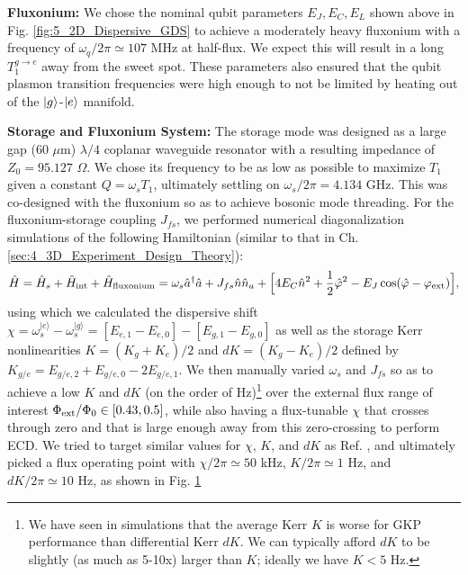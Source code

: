\noindent \textbf{Fluxonium:} We chose the nominal qubit parameters $E_J, E_C, E_L$ shown above in Fig. \ref{fig:5_2D_Dispersive_GDS} to achieve a moderately heavy fluxonium with a frequency of $\omega_q/2\pi \simeq 107$ MHz at half-flux. We expect this will result in a long $T_1^{g\to e}$ away from the sweet spot. These parameters also ensured that the qubit plasmon transition frequencies were high enough to not be limited by heating out of the $\lvert g\rangle$-$\lvert e\rangle$ manifold. 


\noindent \textbf{Storage and Fluxonium System:} The storage mode was designed as a large gap (60 $\mu$m) $\lambda/4$ coplanar waveguide resonator with a resulting impedance of $Z_0 = 95.127$ $\Omega$. We chose its frequency to be as low as possible to maximize $T_1$ given a constant $Q = \omega_s T_1$, ultimately settling on $\omega_s/2\pi = 4.134$ GHz. This was co-designed with the fluxonium so as to achieve bosonic mode threading. For the fluxonium-storage coupling $J_{fs}$, we performed numerical diagonalization simulations of the following Hamiltonian (similar to that in Ch. \ref{sec:4_3D_Experiment_Design_Theory}):
\begin{equation}
    \hat{H} =  \hat{H}_s + \hat{H}_{\rm int} + \hat{H}_{\rm fluxonium} =  \omega_s \hat{a}^\dagger \hat{a} + J_{fs} \hat{n}\hat{n}_a + \Big[4E_C \hat{n}^2 + \frac{1}{2}\hat{\varphi}^2 - E_J\cos(\hat{\varphi}-\varphi_{\rm ext})\Big],
\end{equation}
using which we calculated the dispersive shift $\chi = \omega_s^{|e\rangle} - \omega_s^{|g\rangle} = [E_{e,1} - E_{e, 0}] - [E_{g, 1} - E_{g, 0}]$ as well as the storage Kerr nonlinearities $K = (K_g + K_e)/2$ and $dK = (K_g - K_e)/2$ defined by $K_{g/e} = E_{g/e, 2} + E_{g/e, 0} - 2E_{g/e, 1}$. We then manually varied $\omega_s$ and $J_{fs}$ so as to achieve a low $K$ and $dK$ (on the order of Hz)\footnote{We have seen in simulations that the average Kerr $K$ is worse for GKP performance than differential Kerr $dK$. We can typically afford $dK$ to be slightly (as much as 5-10x) larger than $K$; ideally we have $K < 5$ Hz.} over the external flux range of interest $\Phi_{\rm ext}/\Phi_0 \in [0.43, 0.5]$, while also having a flux-tunable $\chi$ that crosses through zero and that is large enough away from this zero-crossing to perform ECD. We tried to target similar values for $\chi$, $K$, and $dK$ as Ref. \cite{sivak2023gkp-expt}, and ultimately picked a flux operating point with $\chi/2\pi \simeq 50$ kHz, $K/2\pi \simeq 1$ Hz, and $dK/2\pi \simeq 10$ Hz, as shown in Fig. \ref{fig:5_2D_disp_chi_and_Kerr} 
\begin{figure}[h]
    \centering
    \caption{}
    \label{fig:5_2D_disp_chi_and_Kerr}
\end{figure}


